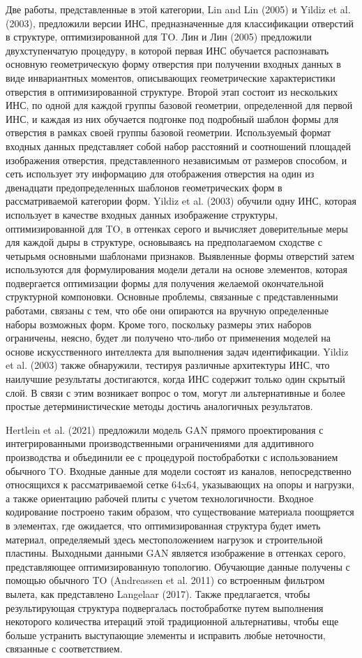 Две работы, представленные в этой категории, Lin and Lin (2005) и Yildiz et al. (2003), предложили версии ИНС, предназначенные для классификации отверстий в структуре, оптимизированной для TO. Лин и Лин (2005) предложили двухступенчатую процедуру, в которой первая ИНС обучается распознавать основную геометрическую форму отверстия при получении входных данных в виде инвариантных моментов, описывающих геометрические характеристики отверстия в оптимизированной структуре. Второй этап состоит из нескольких ИНС, по одной для каждой группы базовой геометрии, определенной для первой ИНС, и каждая из них обучается подгонке под подробный шаблон формы для отверстия в рамках своей группы базовой геометрии. Используемый формат входных данных представляет собой набор расстояний и соотношений площадей изображения отверстия, представленного независимым от размеров способом, и сеть использует эту информацию для отображения отверстия на один из двенадцати предопределенных шаблонов геометрических форм в рассматриваемой категории форм. Yildiz et al. (2003) обучили одну ИНС, которая использует в качестве входных данных изображение структуры, оптимизированной для TO, в оттенках серого и вычисляет доверительные меры для каждой дыры в структуре, основываясь на предполагаемом сходстве с четырьмя основными шаблонами признаков. Выявленные формы отверстий затем используются для формулирования модели детали на основе элементов, которая подвергается оптимизации формы для получения желаемой окончательной структурной компоновки. Основные проблемы, связанные с представленными работами, связаны с тем, что обе они опираются на вручную определенные наборы возможных форм. Кроме того, поскольку размеры этих наборов ограничены, неясно, будет ли получено что-либо от применения моделей на основе искусственного интеллекта для выполнения задач идентификации. Yildiz et al. (2003) также обнаружили, тестируя различные архитектуры ИНС, что наилучшие результаты достигаются, когда ИНС содержит только один скрытый слой. В связи с этим возникает вопрос о том, могут ли альтернативные и более простые детерминистические методы достичь аналогичных результатов.

Hertlein et al. (2021) предложили модель GAN прямого проектирования с интегрированными производственными ограничениями для аддитивного производства и объединили ее с процедурой постобработки с использованием обычного TO. Входные данные для модели состоят из каналов, непосредственно относящихся к рассматриваемой сетке 64x64, указывающих на опоры и нагрузки, а также ориентацию рабочей плиты с учетом технологичности. Входное кодирование построено таким образом, что существование материала поощряется в элементах, где ожидается, что оптимизированная структура будет иметь материал, определяемый здесь местоположением нагрузок и строительной пластины. Выходными данными GAN является изображение в оттенках серого, представляющее оптимизированную топологию. Обучающие данные получены с помощью обычного TO (Andreassen et al. 2011) со встроенным фильтром вылета, как представлено Langelaar (2017). Также предлагается, чтобы результирующая структура подвергалась постобработке путем выполнения некоторого количества итераций этой традиционной альтернативы, чтобы еще больше устранить выступающие элементы и исправить любые неточности, связанные с соответствием.

